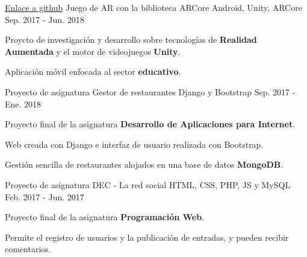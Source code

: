 

\begin{cventries}

  \cventry
    {\href{https://github.com/matl1995/TFG}{Enlace a github}} %
    {Juego de AR con la biblioteca ARCore} %
    {Android, Unity, ARCore} %
    {Sep. 2017 - Jun. 2018} %
    {
      \begin{cvitems} %
        \item {Proycto de investigación y desarrollo sobre tecnologías de \textbf{Realidad Aumentada} y el motor de videojuegos \textbf{Unity}.}
        \item {Aplicación móvil enfocada al sector \textbf{educativo}.}
      \end{cvitems}
    }

  \cventry
    {Proyecto de asignatura} %
    {Gestor de restaurantes} %
    {Django y Bootstrap} %
    {Sep. 2017 - Ene. 2018} %
    {
      \begin{cvitems} %
        \item {Proyecto final de la asignatura \textbf{Desarrollo de Aplicaciones para Internet}.}
        \item {Web creada con Django e interfaz de usuario realizada con Bootstrap.}
        \item {Gestión sencilla de restaurantes alojados en una base de datos \textbf{MongoDB}.}
      \end{cvitems}
    }

  \cventry
    {Proyecto de asignatura} %
    {DEC - La red social} %
    {HTML, CSS, PHP, JS y MySQL} %
    {Feb. 2017 - Jun. 2017} %
    {
      \begin{cvitems} %
        \item {Proyecto final de la asignatura \textbf{Programación Web}.}
        \item {Permite el registro de usuarios y la publicación de entradas, y pueden recibir comentarios.}
      \end{cvitems}
    }


\end{cventries}
